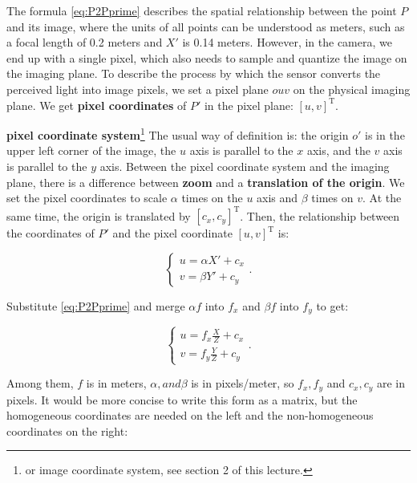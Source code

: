 The formula \eqref{eq:P2Pprime} describes the spatial relationship between the point $P$ and its image, where the units of all points can be understood as meters, such as a focal length of 0.2 meters and $X'$ is 0.14 meters. However, in the camera, we end up with a single pixel, which also needs to sample and quantize the image on the imaging plane. To describe the process by which the sensor converts the perceived light into image pixels, we set a pixel plane $ouv$ on the physical imaging plane. We get \textbf{pixel coordinates} of $P'$ in the pixel plane: $[u,v]^\mathrm{T}$.

\textbf{pixel coordinate system}\footnote{ or image coordinate system, see section 2 of this lecture. } The usual way of definition is: the origin $o'$ is in the upper left corner of the image, the $u$ axis is parallel to the $x$ axis, and the $v$ axis is parallel to the $y$ axis. Between the pixel coordinate system and the imaging plane, there is a difference between \textbf{zoom} and a \textbf{translation of the origin}. We set the pixel coordinates to scale $\alpha$ times on the $u$ axis and $\beta$ times on $v$. At the same time, the origin is translated by $[c_x, c_y]^\mathrm{T}$. Then, the relationship between the coordinates of $P'$ and the pixel coordinate $[u,v]^\mathrm{T}$ is:

\begin{equation}
\label{eq:project2pixel1} 
\left\{
\begin{matrix} 
u=\alpha X' + c_x\\ 
v=\beta Y' + c_y
\end{matrix}
\right. .
\end{equation}

Substitute \eqref{eq:P2Pprime} and merge $\alpha f$ into $f_x$ and $\beta f$ into $f_y$ to get:

\begin{equation}
\left\{
\begin{matrix} 
u=f_x\frac{X}{Z} + c_x\\ 
v=f_y\frac{Y}{Z} + c_y
\end{matrix}
\right. .
\end{equation}

Among them, $f$ is in meters, $\alpha, and \beta$ is in pixels/meter, so $f_x, f_y$ and $c_x, c_y$ are in pixels. It would be more concise to write this form as a matrix, but the homogeneous coordinates are needed on the left and the non-homogeneous coordinates on the right:


